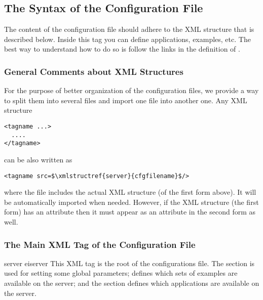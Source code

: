 \subsection{The Syntax of the Configuration File}
\label{ch:server:config:xml}

The content of the configuration file should adhere to the
 XML structure that is described below.
%
Inside this tag you can define applications, examples, etc. The best
way to understand how to do so is follow the links in the definition
of .

\subsubsection*{General Comments about XML Structures} 

For the purpose of better organization of the configuration files, we
provide a way to split them into several files and import one file
into another one. Any XML structure

\medskip
\begin{lstlisting}
<tagname ...>
  ....
</tagname>
\end{lstlisting}

\medskip
\noindent
can be also written as

\medskip
\begin{lstlisting}
<tagname src=$\xmlstructref{server}{cfgfilename}$/>
\end{lstlisting}

\medskip
\noindent
where the file  includes the actual
XML structure (of the first form above). It will be automatically
imported when needed. However, if the XML structure (the first form)
has an attribute  then it must appear as an attribute in the
second form as well.

\subsubsection*{The Main XML Tag of the Configuration File}

\bigskip
\xmlstruct
{server}
{eiserver}
{%
This XML tag is the root of the configurations file.
%
The  section is used for setting some
global parameters;  defines which sets
of examples are available on the server; and the
 section defines which applications are
available on the server.
%
}



